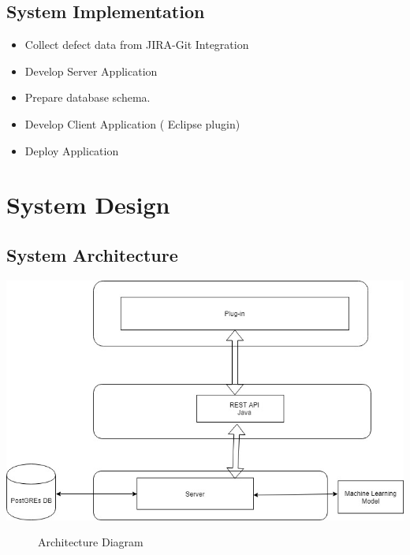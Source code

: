 \documentclass[oneside,a4paper,12pt]{book}
\begin{document}
\section{System Implementation}
\setlength{\parskip}{0.0pt}
\begin{itemize}

	\item Collect defect data from JIRA-Git Integration\par

	\item Develop Server Application\par

	\item Prepare database schema.\par

	\item Develop Client Application ( Eclipse plugin)\par

	\item Deploy Application
\end{itemize}\par

\newpage
\chapter{System Design}

\section{System Architecture}

\includegraphics[width=\textwidth]{archi.jpg}
\begin{figure}[h]
    \caption{Architecture Diagram}
    \label{fig:Architecture of Code Impact Analyzer}
\end{figure}
\end{document}
